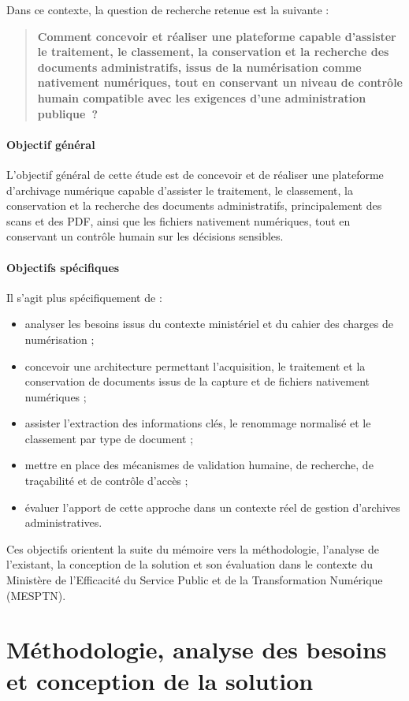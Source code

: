 \documentclass[12pt,a4paper]{report}
\newcommand{\nomMinistere}{Ministère de l'Efficacité du Service Public et de la Transformation Numérique (MESPTN)}
\newcommand{\problematiqueMemoire}{Comment concevoir et réaliser une plateforme capable d'assister le traitement, le classement, la conservation et la recherche des documents administratifs, issus de la numérisation comme nativement numériques, tout en conservant un niveau de contrôle humain compatible avec les exigences d'une administration publique~?}
\begin{document}
Dans ce contexte, la question de recherche retenue est la suivante :

\begin{quote}
\textbf{\problematiqueMemoire}
\end{quote}

\subsection{Objectif général}
L'objectif général de cette étude est de concevoir et de réaliser une plateforme d'archivage numérique capable d'assister le traitement, le classement, la conservation et la recherche des documents administratifs, principalement des scans et des PDF, ainsi que les fichiers nativement numériques, tout en conservant un contrôle humain sur les décisions sensibles.

\subsection{Objectifs spécifiques}
Il s'agit plus spécifiquement de :
\begin{itemize}
  \item analyser les besoins issus du contexte ministériel et du cahier des charges de numérisation ;
  \item concevoir une architecture permettant l'acquisition, le traitement et la conservation de documents issus de la capture et de fichiers nativement numériques ;
  \item assister l'extraction des informations clés, le renommage normalisé et le classement par type de document ;
  \item mettre en place des mécanismes de validation humaine, de recherche, de traçabilité et de contrôle d'accès ;
  \item évaluer l'apport de cette approche dans un contexte réel de gestion d'archives administratives.
\end{itemize}

Ces objectifs orientent la suite du mémoire vers la méthodologie, l'analyse de l'existant, la conception de la solution et son évaluation dans le contexte du \nomMinistere{}.

\part{Méthodologie, analyse des besoins et conception de la solution}
\thispagestyle{plain}

\end{document}
